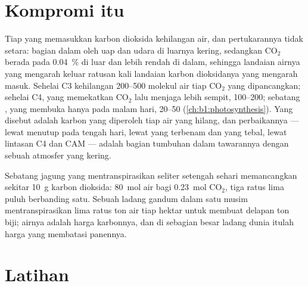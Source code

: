 \section{Kompromi itu}

\begin{proposition}\label{prop:b1:plant-transport:wue}
Tiap  yang memasukkan karbon dioksida kehilangan air, dan
pertukarannya tidak setara: bagian dalam   oleh uap dan
udara di luarnya kering, sedangkan $\mathrm{CO_2}$ berada pada
\qty{0.04}{\%} di luar dan lebih rendah di dalam, sehingga landaian
airnya yang mengarah keluar ratusan kali landaian karbon dioksidanya
yang mengarah masuk. Sehelai  C3 kehilangan
\qtyrange{200}{500}{} molekul air tiap $\mathrm{CO_2}$ yang
dipancangkan; sehelai  C4, yang memekatkan $\mathrm{CO_2}$ lalu
menjaga  lebih sempit, \qtyrange{100}{200}{}; sebatang
, yang membuka hanya pada malam hari,
\qtyrange{20}{50}{} (\cref{ch:b1:photosynthesis}). Yang disebut
\emph{} adalah karbon yang diperoleh tiap air
yang hilang, dan perbaikannya --- lewat menutup pada tengah hari,
lewat  yang terbenam dan  yang tebal, lewat lintasan C4
dan CAM --- adalah bagian tumbuhan dalam tawarannya dengan sebuah
atmosfer yang kering.
\end{proposition}

\begin{example}\label{ex:b1:plant-transport:bargain}
Sebatang jagung yang mentranspirasikan seliter setengah sehari
memancangkan sekitar \qty{10}{g} karbon dioksida: \qty{80}{mol} air
bagi \qty{0.23}{mol} $\mathrm{CO_2}$, tiga ratus lima puluh berbanding
satu. Sebuah ladang gandum dalam satu musim mentranspirasikan lima
ratus ton air tiap hektar untuk membuat delapan ton biji; airnya
adalah harga karbonnya, dan di sebagian besar ladang dunia itulah
harga yang membatasi panennya.
\end{example}

\section{Latihan}

